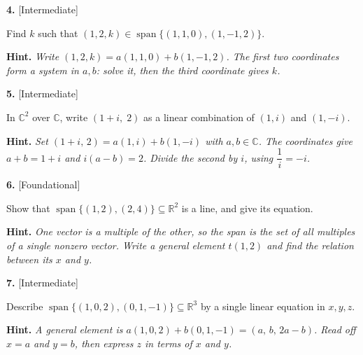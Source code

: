 \documentclass[11pt]{article}
\begin{document}
\begin{minipage}{\linewidth}\textbf{4.} \hfill{\scriptsize\color{ink}[Intermediate]}\par\nopagebreak Find $k$ such that $(1,2,k)\in\operatorname{span}\{(1,1,0),(1,-1,2)\}$.
\par\smallskip\begingroup\small\color{ink}\textbf{Hint.} \textit{Write $(1,2,k)=a(1,1,0)+b(1,-1,2)$. The first two coordinates form a system in $a,b$: solve it, then the third coordinate gives $k$.}\endgroup
\vspace{3.6cm}\end{minipage}\par\vspace{4pt}
\begin{minipage}{\linewidth}\textbf{5.} \hfill{\scriptsize\color{ink}[Intermediate]}\par\nopagebreak In $\mathbb{C}^{2}$ over $\mathbb{C}$, write $(1+i,\;2)$ as a linear combination of $(1,i)$ and $(1,-i)$.
\par\smallskip\begingroup\small\color{ink}\textbf{Hint.} \textit{Set $(1+i,\,2)=a(1,i)+b(1,-i)$ with $a,b\in\mathbb{C}$. The coordinates give $a+b=1+i$ and $i(a-b)=2$. Divide the second by $i$, using $\dfrac1i=-i$.}\endgroup
\vspace{4.4cm}\end{minipage}\par\vspace{4pt}
\begin{minipage}{\linewidth}\textbf{6.} \hfill{\scriptsize\color{ink}[Foundational]}\par\nopagebreak Show that $\operatorname{span}\{(1,2),(2,4)\}\subseteq\mathbb{R}^{2}$ is a line, and give its equation.
\par\smallskip\begingroup\small\color{ink}\textbf{Hint.} \textit{One vector is a multiple of the other, so the span is the set of all multiples of a single nonzero vector. Write a general element $t(1,2)$ and find the relation between its $x$ and $y$.}\endgroup
\vspace{3.4cm}\end{minipage}\par\vspace{4pt}
\begin{minipage}{\linewidth}\textbf{7.} \hfill{\scriptsize\color{ink}[Intermediate]}\par\nopagebreak Describe $\operatorname{span}\{(1,0,2),(0,1,-1)\}\subseteq\mathbb{R}^{3}$ by a single linear equation in $x,y,z$.
\par\smallskip\begingroup\small\color{ink}\textbf{Hint.} \textit{A general element is $a(1,0,2)+b(0,1,-1)=(a,\,b,\,2a-b)$. Read off $x=a$ and $y=b$, then express $z$ in terms of $x$ and $y$.}\endgroup
\vspace{4.0cm}\end{minipage}\par\vspace{4pt}
\end{document}
